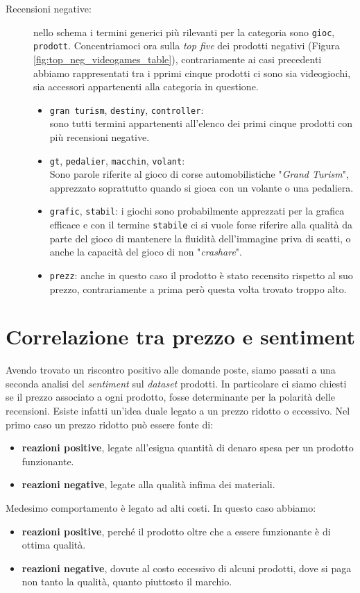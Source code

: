 \begin{description}
				\item[Recensioni negative:] 
				nello schema i termini generici più rilevanti per la categoria sono \verb|gioc|, \verb|prodott|. Concentriamoci ora sulla \textit{top five} dei prodotti negativi (Figura \ref{fig:top_neg_videogames_table}), contrariamente ai casi precedenti abbiamo rappresentati tra i pprimi cinque prodotti ci sono sia videogiochi, sia accessori appartenenti alla categoria in questione.
				\begin{itemize}
					\item \texttt{gran turism}, \texttt{destiny}, \texttt{controller}: \\
					sono tutti termini appartenenti all'elenco dei primi cinque prodotti con più recensioni negative. 
					\item \texttt{gt}, \texttt{pedalier}, \texttt{macchin}, \texttt{volant}: \\
					Sono parole riferite al gioco di corse automobilistiche "\textit{Grand Turism}", apprezzato soprattutto quando si gioca con un volante o una pedaliera. 
					\item \texttt{grafic}, \texttt{stabil}: 
					i giochi sono probabilmente apprezzati per la grafica efficace e con il termine \verb|stabile| ci si vuole forse riferire alla qualità da parte del gioco di  mantenere la fluidità dell'immagine priva di scatti, o anche la capacità del gioco di non "\textit{crashare}".
					\item \texttt{prezz}: 
					anche in questo caso il prodotto è stato recensito rispetto al suo prezzo, contrariamente a prima però questa volta trovato troppo alto.
				\end{itemize}
			\end{description}
			
	\section{Correlazione tra prezzo e sentiment}
		Avendo trovato un riscontro positivo alle domande poste, siamo passati a una seconda analisi del \textit{sentiment} sul \textit{dataset} prodotti. In particolare ci siamo chiesti se il prezzo associato a ogni prodotto, fosse determinante per la polarità delle recensioni. Esiste infatti un'idea duale legato a un prezzo ridotto o eccessivo. Nel primo caso un prezzo ridotto può essere fonte di:
		\begin{itemize}
			\item \textbf{reazioni positive}, legate all'esigua quantità di denaro spesa per un prodotto funzionante.
			\item \textbf{reazioni negative}, legate alla qualità infima dei materiali.
		\end{itemize}
		Medesimo comportamento è legato ad alti costi. In questo caso abbiamo:
		\begin{itemize}
			\item \textbf{reazioni positive}, perché il prodotto oltre che a essere funzionante è di ottima qualità.
			\item \textbf{reazioni negative}, dovute al costo eccessivo di alcuni prodotti, dove si paga non tanto la qualità, quanto piuttosto il marchio.
		\end{itemize}
		
		